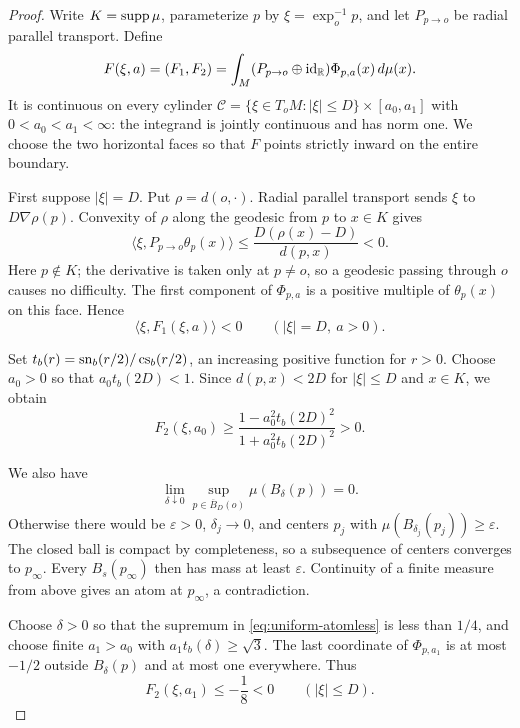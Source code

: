 \begin{proof}
Write $K=\operatorname{supp}\mu$, parameterize $p$ by $\xi=\exp_o^{-1}p$, and let
$P_{p\to o}$ be radial parallel transport. Define
\[
 F(\xi,a)=(F_1,F_2)
 =\int_M(P_{p\to o}\oplus\mathrm{id}_{\mathbb R})\Phi_{p,a}(x)\,d\mu(x).
\]
It is continuous on every cylinder
$\mathcal C=\{\xi\in T_oM:|\xi|\le D\}\times[a_0,a_1]$
with $0<a_0<a_1<\infty$: the integrand is jointly continuous and has
norm one. We choose the two horizontal faces so that $F$ points
strictly inward on the entire boundary.

First suppose $|\xi|=D$. Put $\rho=d(o,\cdot)$. Radial parallel
transport sends $\xi$ to $D\nabla\rho(p)$. Convexity of $\rho$ along
the geodesic from $p$ to $x\in K$ gives
\[
 \langle\xi,P_{p\to o}\theta_p(x)\rangle
 \le\frac{D(\rho(x)-D)}{d(p,x)}<0.
\]
Here $p\notin K$; the derivative is taken only at $p\ne o$, so a
geodesic passing through $o$ causes no difficulty. The first component
of $\Phi_{p,a}$ is a positive multiple of $\theta_p(x)$ on this face.
Hence
\begin{equation}\label{eq:balance-side}
 \langle\xi,F_1(\xi,a)\rangle<0
 \qquad(|\xi|=D,\ a>0).
\end{equation}

Set $t_b(r)=\operatorname{sn}_b(r/2)/\operatorname{cs}_b(r/2)$, an increasing positive function
for $r>0$. Choose $a_0>0$ so that $a_0t_b(2D)<1$.
Since $d(p,x)<2D$ for $|\xi|\le D$ and $x\in K$, we obtain
\begin{equation}\label{eq:balance-bottom}
 F_2(\xi,a_0)\ge
 \frac{1-a_0^2t_b(2D)^2}{1+a_0^2t_b(2D)^2}>0.
\end{equation}

We also have
\begin{equation}\label{eq:uniform-atomless}
 \lim_{\delta\downarrow0}\sup_{p\in\overline B_D(o)}
                            \mu(B_\delta(p))=0.
\end{equation}
Otherwise there would be $\varepsilon>0$, $\delta_j\to0$, and centers
$p_j$ with $\mu(B_{\delta_j}(p_j))\ge\varepsilon$. The closed ball is
compact by completeness, so a subsequence of centers converges to
$p_\infty$. Every $B_s(p_\infty)$ then has mass at least $\varepsilon$.
Continuity of a finite measure from above gives an atom at $p_\infty$,
a contradiction.

Choose $\delta>0$ so that the supremum in
\eqref{eq:uniform-atomless} is less than $1/4$, and choose finite
$a_1>a_0$ with $a_1t_b(\delta)\ge\sqrt3$.
The last coordinate of $\Phi_{p,a_1}$ is at most $-1/2$ outside
$B_\delta(p)$ and at most one everywhere. Thus
\begin{equation}\label{eq:balance-top}
 F_2(\xi,a_1)\le-\frac18<0\qquad(|\xi|\le D).
\end{equation}


\end{proof}
